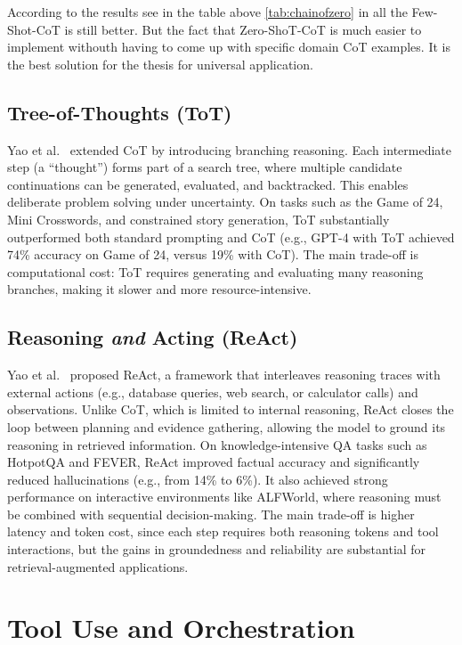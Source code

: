 According to the results see in the table above \ref{tab:chainofzero} in all the Few-Shot-CoT is still better. But the fact that Zero-ShoT-CoT is much easier to implement withouth having to come up with specific domain CoT examples. It is the best solution for the thesis for universal application.


\subsection{Tree-of-Thoughts (ToT)}
Yao et al.~\cite{treeofthought} extended CoT by introducing branching reasoning. Each intermediate step (a ``thought'') forms part of a search tree, where multiple candidate continuations can be generated, evaluated, and backtracked. This enables deliberate problem solving under uncertainty. On tasks such as the Game of 24, Mini Crosswords, and constrained story generation, ToT substantially outperformed both standard prompting and CoT (e.g., GPT-4 with ToT achieved 74\% accuracy on Game of 24, versus 19\% with CoT). The main trade-off is computational cost: ToT requires generating and evaluating many reasoning branches, making it slower and more resource-intensive.

\subsection{Reasoning \emph{and} Acting (ReAct)}
Yao et al.~\cite{react} proposed ReAct, a framework that interleaves reasoning traces with external actions (e.g., database queries, web search, or calculator calls) and observations. Unlike CoT, which is limited to internal reasoning, ReAct closes the loop between planning and evidence gathering, allowing the model to ground its reasoning in retrieved information. On knowledge-intensive QA tasks such as HotpotQA and FEVER, ReAct improved factual accuracy and significantly reduced hallucinations (e.g., from 14\% to 6\%). It also achieved strong performance on interactive environments like ALFWorld, where reasoning must be combined with sequential decision-making. The main trade-off is higher latency and token cost, since each step requires both reasoning tokens and tool interactions, but the gains in groundedness and reliability are substantial for retrieval-augmented applications.

\section{Tool Use and Orchestration}

